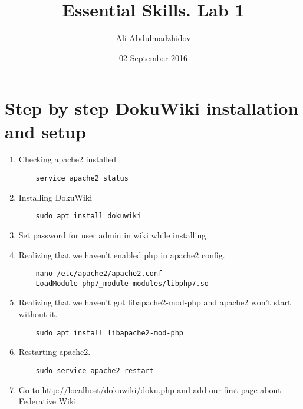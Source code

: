 \documentclass[10pt]{article}
\title{Essential Skills. Lab 1}
\date{02 September 2016}
\author{Ali Abdulmadzhidov}
\begin{document}
\renewcommand*\rmdefault{cmss}
  \maketitle
  \section{Step by step DokuWiki installation and setup     \newline}

  \begin{enumerate}
    \item Checking apache2 installed
    \begin{verbatim}
    service apache2 status
    \end{verbatim}
    \item Installing DokuWiki
    \begin{verbatim}
    sudo apt install dokuwiki
    \end{verbatim}
    \item Set password for user admin in wiki while installing
    \item Realizing that we haven't enabled php in apache2 config. 
    \begin{verbatim}
    nano /etc/apache2/apache2.conf
    LoadModule php7_module modules/libphp7.so 
    \end{verbatim}
    \item Realizing that we haven't got libapache2-mod-php and apache2 won't start without it. 
    \begin{verbatim}
    sudo apt install libapache2-mod-php 
    \end{verbatim}
    \item Restarting apache2. 
    \begin{verbatim}
    sudo service apache2 restart
    \end{verbatim}
    \item Go to http://localhost/dokuwiki/doku.php and add our first page about Federative Wiki
  \end{enumerate}
\end{document}
